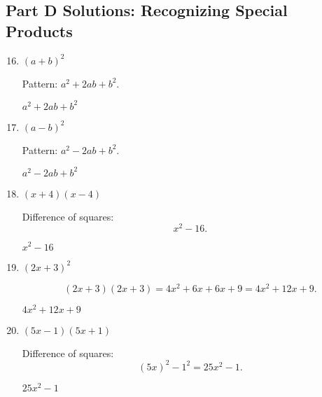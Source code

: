 \documentclass[12pt]{article}
\begin{document}
\subsection*{Part D Solutions: Recognizing Special Products}
\begin{enumerate}
  \setcounter{enumi}{15}
  \item \((a + b)^2\)

  Pattern: \(a^2 + 2ab + b^2.\)

  \(\boxed{a^2 + 2ab + b^2}\)

  \item \((a - b)^2\)

  Pattern: \(a^2 - 2ab + b^2.\)

  \(\boxed{a^2 - 2ab + b^2}\)

  \item \((x + 4)(x - 4)\)

  Difference of squares:
  \[
  x^2 - 16.
  \]

  \(\boxed{x^2 - 16}\)

  \item \((2x + 3)^2\)

  \[
  (2x + 3)(2x + 3)
  = 4x^2 + 6x + 6x + 9
  = 4x^2 + 12x + 9.
  \]

  \(\boxed{4x^2 + 12x + 9}\)

  \item \((5x - 1)(5x + 1)\)

  Difference of squares:
  \[
  (5x)^2 - 1^2 = 25x^2 - 1.
  \]

  \(\boxed{25x^2 - 1}\)
\end{enumerate}
\end{document}

